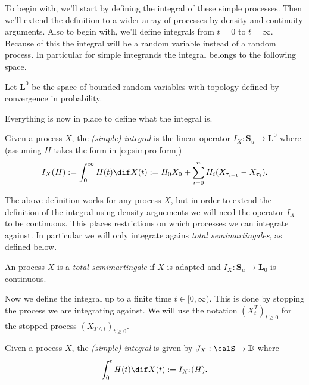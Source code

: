 \documentclass{scrreprt}
\theoremstyle{remark}
\newcommand{\simpro}{\mathbf S}
\newcommand{\cadspace}{\mathbb D}
\newcommand\defeq{:=}
\begin{document}
To begin with, we'll start by defining the integral of these simple processes. Then we'll extend the definition to a wider array of processes by density and continuity arguments. Also to begin with, we'll define integrals from $t = 0$ to $t = \infty$. Because of this the integral will be a random variable instead of a random process. In particular for simple integrands the integral belongs to the following space.

\begin{defn}
	Let $\mathbf L^0$ be the space of bounded random variables with topology defined by convergence in probability.
\end{defn}

Everything is now in place to define what the integral is.

\begin{defn}
	Given a process $X$, the \emph{(simple) integral} is the linear operator $I_X : \simpro_u \to \mathbf L^0$ where (assuming $H$ takes the form in \vref{eq:simpro-form})
	\begin{equation}
		 I_X(H) \defeq \int_0^{\infty} H(t) \dif X(t) \defeq H_0 X_0 + \sum_{i=0}^n H_i (X_{\tau_{i+1}} - X_{\tau_i}).
	\end{equation}
\end{defn}

The above definition works for any process $X$, but in order to extend the definition of the integral using density arguements we will need the operator $I_X$ to be continuous. This places restrictions on which \cadlag{} processes we can integrate against. In particular we will only integrate agains \emph{total semimartingales}, as defined below.

\begin{defn}
	An process $X$ is a \emph{total semimartingale} if $X$ is adapted and $I_X : \mathbf S_u \to \mathbf L_0$ is continuous.
\end{defn}

Now we define the integral up to a finite time $t \in [0, \infty)$. This is done by stopping the process we are integrating against. We will use the notation $(X^T_t)_{t \geq 0}$ for the stopped process $(X_{T \wedge t})_{t \geq 0}$.

\begin{defn}
	Given a process $X$, the \emph{(simple) integral} is given by $J_X: \calS \to \cadspace$ where
	\begin{equation}
		\int_0^t H(t) \dif X(t) \defeq I_{X^t}(H).
	\end{equation}
\end{defn}
\end{document}
